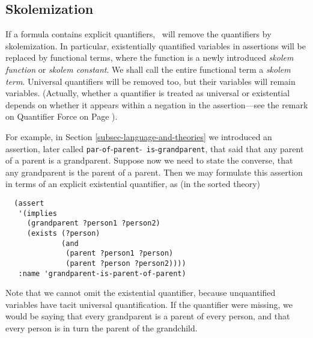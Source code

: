 
\subsection{Skolemization}
\label{subsec-skolemization}

If a formula contains explicit quantifiers, \snark\
will remove the quantifiers by skolemization.  In particular,
existentially quantified variables in assertions will be replaced by
functional terms, where the function is a newly introduced {\em skolem
function} or {\em skolem constant}.  We shall call the entire
functional term a {\em skolem term}.  Universal quantifiers will be
removed too, but their variables will remain variables. (Actually, whether a
quantifier is treated as universal or existential depends on whether it
appears within a negation in the assertion---see the remark on Quantifier
Force on Page {\pageref{subsec-quantifier-force}}).

For example, in Section \ref{subsec-language-and-theories} we introduced an
assertion, later called {\tt par}\-{\tt ent}-{\tt of}-{\tt parent}-{\tt
is}-{\tt grandparent}, that said that any parent of a parent is a
grandparent.  Suppose now we need to state the converse, that any grandparent
is the parent of a parent.  Then we may formulate this assertion in terms of
an explicit existential quantifier, as (in the sorted theory)
\begin{verbatim}
  (assert
   '(implies
     (grandparent ?person1 ?person2)
     (exists (?person)
             (and
              (parent ?person1 ?person)
              (parent ?person ?person2))))
   :name 'grandparent-is-parent-of-parent)
\end{verbatim}
Note that we cannot omit the existential quantifier, because
unquantified variables have tacit universal quantification.  If the
quantifier were missing, we would be saying that every grandparent is a
parent of every person, and that every person is in turn the parent of
the grandchild.

